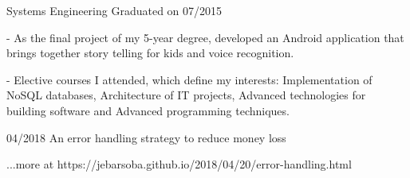 \documentclass[11pt]{article} %
\begin{document}

\begin{description}
\squish
{}
           {Systems Engineering}
           {Graduated on 07/2015}

- As the final project of my 5-year degree, developed an Android application that brings together story telling for kids and voice recognition.

- Elective courses I attended, which define my interests: Implementation of NoSQL databases, Architecture of IT projects, Advanced technologies for building software and Advanced programming techniques.

\end{description}


\squish

      {04/2018}
      {}
      {An error handling strategy to reduce money loss}

\hfill \small ...more at https://jebarsoba.github.io/2018/04/20/error-handling.html
\end{document}
